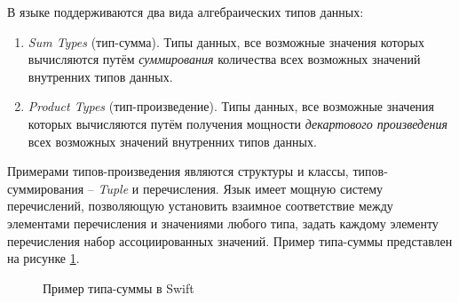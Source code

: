 В языке поддерживаются два вида алгебраических типов данных:

\begin{enumerate}
	\item \emph{Sum Types} (тип-сумма). Типы данных, все возможные значения которых вычисляются путём \textit{суммирования} количества всех возможных значений внутренних типов данных.
	\item \emph{Product Types} (тип-произведение). Типы данных, все возможные значения которых вычисляются путём получения мощности \textit{декартового произведения} всех возможных значений внутренних типов данных.
\end{enumerate}

Примерами типов-произведения являются структуры и классы, типов-суммирования -- \textit{Tuple} и перечисления. Язык имеет мощную систему перечислений, позволяющую установить взаимное соответствие между элементами перечисления и значениями любого типа, задать каждому элементу перечисления набор ассоциированных значений. Пример типа-суммы представлен на рисунке \ref{sec:development:arch:ios:swift:code:barcode}.

\begin{figure}[h]
	
   \caption{Пример типа-суммы в Swift}
   \label{sec:development:arch:ios:swift:code:barcode}
\end{figure}